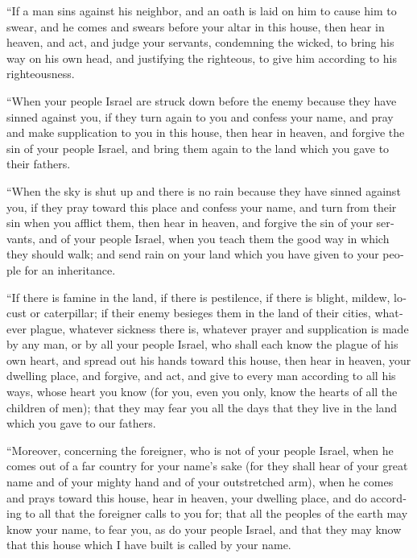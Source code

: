 \begin{paracol}{2}
\begin{otherlanguage}{english}
 ``If a man sins against his neighbor, and an oath is
laid on him to cause him to swear, and he comes and swears before your
altar in this house,  then hear in heaven, and act, and
judge your servants, condemning the wicked, to bring his way on his own
head, and justifying the righteous, to give him according to his
righteousness.

 ``When your people Israel are struck down before the
enemy because they have sinned against you, if they turn again to you
and confess your name, and pray and make supplication to you in this
house,  then hear in heaven, and forgive the sin of your
people Israel, and bring them again to the land which you gave to their
fathers.

 ``When the sky is shut up and there is no rain because
they have sinned against you, if they pray toward this place and confess
your name, and turn from their sin when you afflict them,
 then hear in heaven, and forgive the sin of your
servants, and of your people Israel, when you teach them the good way in
which they should walk; and send rain on your land which you have given
to your people for an inheritance.

 ``If there is famine in the land, if there is
pestilence, if there is blight, mildew, locust or caterpillar; if their
enemy besieges them in the land of their cities, whatever plague,
whatever sickness there is,  whatever prayer and
supplication is made by any man, or by all your people Israel, who shall
each know the plague of his own heart, and spread out his hands toward
this house,  then hear in heaven, your dwelling place,
and forgive, and act, and give to every man according to all his ways,
whose heart you know (for you, even you only, know the hearts of all the
children of men);  that they may fear you all the days
that they live in the land which you gave to our fathers.

 ``Moreover, concerning the foreigner, who is not of your
people Israel, when he comes out of a far country for your name's sake
 (for they shall hear of your great name and of your
mighty hand and of your outstretched arm), when he comes and prays
toward this house,  hear in heaven, your dwelling place,
and do according to all that the foreigner calls to you for; that all
the peoples of the earth may know your name, to fear you, as do your
people Israel, and that they may know that this house which I have built
is called by your name.


\end{otherlanguage}
\end{paracol}
